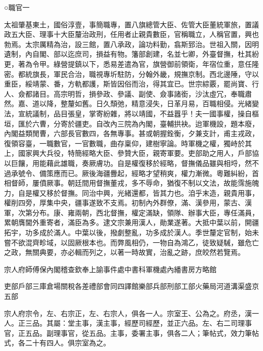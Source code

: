 
\begin{pinyinscope}
○職官一

太祖肇基東土，國俗淳壹，事簡職專，置八旗總管大臣、佐管大臣董統軍旅，置議政五大臣、理事十大臣釐治政刑，任用者止親貴數臣，官稱職立，人稱官置，興也勃焉。太宗厲精為治，設三館，置八承政，論功料勤，翕斯郅治。世祖入關，因明遺制，內自閣、部以迄庶司，損益有物。籓部創建，名並七卿，外臺督撫，杜其紛更，著為令甲。綠營提鎮以下，悉易差遣為官，旗營御前領衛，年宿位重，意任隆密。都統旗長，軍民合治，職視專圻駐防，分翰外畿，規撫京制。西北邊陲，守以重臣，綏靖蒙、番，方軌都護，斯皆因俗而治，得其宜已。世宗綜覈，罷尚寶、行人、僉都諸目。高宗明哲，損參政、參議、副使、僉事諸銜，沙汰虛冗，奉職肅然。嘉、道以降，整釐如舊。日久頹弛，精意浸失，日革月易，百職相侵。光緒變法，宣統議制，品目張皇，掌寄紛雜，將以靖國，不益囂乎！夫一國事權，操自樞垣，匯於六曹，分寄於疆吏。自改內三院為內閣，臺輔拱袂。迨軍機設，題本廢，內閣益類閒曹，六部長官數四，各無專事。甚或朝握銓衡，夕兼支計，甫主戎政，復領容臺，一職數官，一官數職，曲存稟仰，建樹寧論。時軍機之權，獨峙於其上，國家興大兵役，特簡經略大臣、參贊大臣，親寄軍要。吏部助之用人，戶部協以巨饟，用能藉此雄職，奏厥膚功。自是權復移於經略，督撫儀品雖與相埒，然不過承號令、備策應而已。厥後海疆釁起，經略才望稍爽，權力漸微。粵難糾紛，首相督師，屢僨厥事。朝廷間用督撫董戎，多不辱命，猶復不制以文法，故能霈施魄力，自是權又移於督撫。同治中興，光緒還都，皆其力也。洎乎末造，親貴用事，權削四旁，厚集中央，疆事遂致不支焉。初制內外群僚，滿、漢參用，蒙古、漢軍，次第分布。康、雍兩朝，西北督撫，權定滿缺，領隊、辦事大臣，專任滿員，累朝膺閫外重寄者，滿臣為多。逮文宗兼用漢人，勛業遂著。大抵中葉以前，開疆拓宇，功多成於滿人。中葉以後，撥劇整亂，功多成於漢人。季世釐定官制，始未嘗不欲混齊畛域，以固厥根本也。而弊風相仍，一物自為鴻乙，徒致疑駴，雖危亡之政，無關典要，亦必輯而列之，以著一時故實，治亂之跡，庶皎然若覽焉。

宗人府師傅保內閣稽查欽奉上諭事件處中書科軍機處內繙書房方略館

吏部戶部三庫倉場關稅各差禮部會同四譯館樂部兵部刑部工部火藥局河道溝渠盛京五部

宗人府宗令，左、右宗正，左、右宗人，俱各一人。宗室王、公為之。府丞，漢一人。正三品。其屬：堂主事，漢主事，經歷司經歷，並正六品。左、右二司理事官，正五品。副理事官，從五品。主事，委署主事，俱各二人；筆帖式，效力筆帖式，各二十有四人。俱宗室為之。


\end{pinyinscope}

